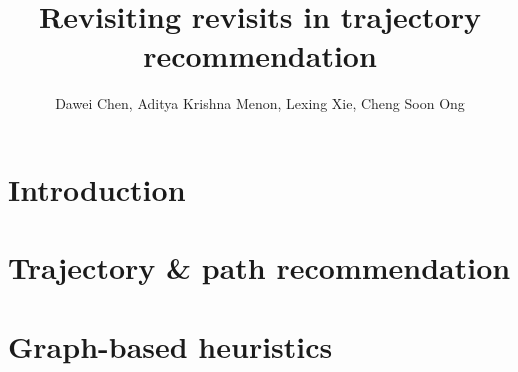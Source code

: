\documentclass[sigconf]{acmart}
\begin{document}
\title{Revisiting revisits in trajectory recommendation}

\author{Dawei Chen, Aditya Krishna Menon, Lexing Xie, Cheng Soon Ong}

\begin{abstract}

\end{abstract}

%
%


\maketitle

\section{Introduction}



\section{Trajectory \& path recommendation}
\label{sec:background}


\section{Graph-based heuristics}
\label{sec:heuristics}

\end{document}
